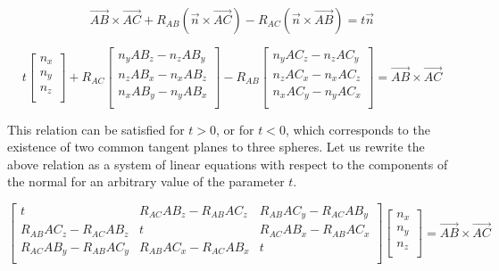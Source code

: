 \documentclass[
11pt,%
tightenlines,%
twoside,%
onecolumn,%
nofloats,%
nobibnotes,%
nofootinbib,%
superscriptaddress,%
noshowpacs,%
centertags]%
{revtex4-2}
\begin{document}
\begin{equation}
\vec{AB} \times \vec{AC} + R_{AB} (\vec{n} \times \vec{AC}) - R_{AC} (\vec{n} \times \vec{AB}) = t \vec{n}
\end{equation}

\begin{equation}
t
\left[ { \begin{array}{c}
            n_x \\
            n_y \\
            n_z \\
         \end{array} } \right]
+ R_{AC}
\left[ { \begin{array}{c}
            n_y AB_z - n_z AB_y  \\
            n_z AB_x - n_x AB_z \\
            n_x AB_y - n_y AB_x \\
         \end{array} } \right]
- R_{AB}
\left[ { \begin{array}{c}
            n_y AC_z - n_z AC_y \\
            n_z AC_x - n_x AC_z \\
            n_x AC_y - n_y AC_x \\
         \end{array} } \right]
= \vec{AB} \times \vec{AC}
\end{equation}

This relation can be satisfied for $t > 0$, or for $t < 0$, which corresponds to the existence of two common tangent planes to three spheres.
Let us rewrite the above relation as a system of linear equations with respect to the components of the normal for an arbitrary value of the parameter $t$.

\begin{equation}
\left[ { \begin{array}{ccc}
             t & R_{AC} AB_z - R_{AB} AC_z & R_{AB} AC_y - R_{AC} AB_y \\
             R_{AB} AC_z - R_{AC} AB_z & t & R_{AC} AB_x - R_{AB} AC_x \\
             R_{AC} AB_y - R_{AB} AC_y & R_{AB} AC_x - R_{AC} AB_x & t \\
         \end{array} } \right]
\left[ { \begin{array}{c}
            n_x \\
            n_y \\
            n_z \\
         \end{array} } \right]
= \vec{AB} \times \vec{AC}
\end{equation}
\end{document}
